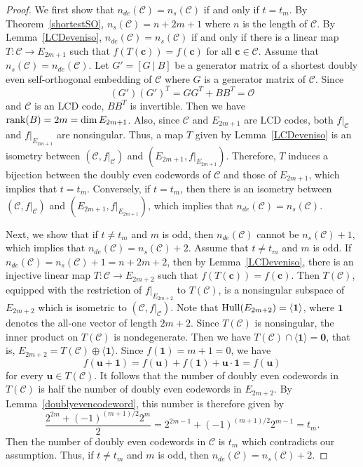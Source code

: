 \documentclass{article}
\theoremstyle{definition}
\theoremstyle{remark}
\begin{document}
\begin{proof}
    We first show that $n_{de}(\mathcal{C})=n_s(\mathcal{C})$ if and only if $t=t_m$. By Theorem~\ref{shortestSO}, $n_s(\mathcal{C})=n+2m+1$ where $n$ is the length of $\mathcal{C}$. By Lemma~\ref{LCDeveniso}, $n_{de}(\mathcal{C})=n_s(\mathcal{C})$ if and only if there is a linear map $T:\mathcal{C}\to E_{2m+1}$ such that $f(T(\mathbf c))=f(\mathbf c)$ for all $\mathbf c\in\mathcal C$. Assume that $n_s(\mathcal{C})=n_{de}(\mathcal{C})$. Let $G'=[G~|~B]$ be a generator matrix of a shortest doubly even self-orthogonal embedding of $\mathcal{C}$ where $G$ is a generator matrix of $\mathcal{C}$. Since
    \[
    (G')(G')^T=GG^T+BB^T=\mathcal{O}
    \]
    and $\mathcal{C}$ is an LCD code, $BB^T$ is invertible. Then we have ${\rm{rank}}(B)=2m=\dim E_{2m+1}$. Also, since $\mathcal{C}$ and $E_{2m+1}$ are LCD codes, both $f|_\mathcal{C}$ and $f|_{E_{2m+1}}$ are nonsingular. Thus, a map $T$ given by Lemma~\ref{LCDeveniso} is an isometry between $(\mathcal{C}, f|_\mathcal{C})$ and $(E_{2m+1}, f|_{E_{2m+1}})$. Therefore, $T$ induces a bijection between the doubly even codewords of $\mathcal{C}$ and those of $E_{2m+1}$, which implies that $t=t_m$. Conversely, if $t=t_m$, then there is an isometry between $(\mathcal{C}, f|_\mathcal{C})$ and $(E_{2m+1}, f|_{E_{2m+1}})$, which implies that $n_{de}(\mathcal{C})=n_s(\mathcal{C})$.
    
    Next, we show that if $t\ne t_m$ and $m$ is odd, then $n_{de}(\mathcal{C})$ cannot be $n_s(\mathcal{C})+1$, which implies that $n_{de}(\mathcal{C})=n_s(\mathcal{C})+2$. Assume that $t\ne t_m$ and $m$ is odd. If $n_{de}(\mathcal{C})=n_s(\mathcal{C})+1=n+2m+2$, then by Lemma~\ref{LCDeveniso}, there is an injective linear map $T:\mathcal{C}\to E_{2m+2}$ such that $f(T(\mathbf c))=f(\mathbf c)$. Then $T(\mathcal{C})$, equipped with the restriction of $f|_{E_{2m+2}}$ to $T(\mathcal{C})$, is a nonsingular subspace of $E_{2m+2}$ which is isometric to $(\mathcal{C}, f|_\mathcal{C})$. Note that ${\rm Hull}(E_{2m+2})=\langle \mathbf{1}\rangle$, where $\mathbf{1}$ denotes the all-one vector of length $2m+2$. Since $T(\mathcal{C})$ is nonsingular, the inner product on $T(\mathcal{C})$ is nondegenerate. Then we have $T(\mathcal{C})\cap\langle\mathbf{1}\rangle=\mathbf{0}$, that is, $E_{2m+2}=T(\mathcal{C})\oplus\langle \mathbf{1}\rangle$. Since $f(\mathbf{1})=m+1=0$, we have 
    \[
    f(\mathbf{u}+\mathbf{1})=f(\mathbf{u})+f(\mathbf{1})+\mathbf{u}\cdot \mathbf{1}=f(\mathbf{u})
    \]
    for every $\mathbf{u}\in T(\mathcal{C})$. It follows that the number of doubly even codewords in $T(\mathcal{C})$ is half the number of doubly even codewords in $E_{2m+2}$. By Lemma~\ref{doublyevencodeword}, this number is therefore given by
    \[
    \frac{2^{2m}+(-1)^{(m+1)/2}2^{m}}{2}=2^{2m-1}+(-1)^{(m+1)/2}2^{m-1}=t_m.
    \]
    Then the number of doubly even codewords in $\mathcal{C}$ is $t_m$ which contradicts our assumption. Thus, if $t\ne t_m$ and $m$ is odd, then $n_{de}(\mathcal{C})=n_s(\mathcal{C})+2$.


\end{proof}
\end{document}
